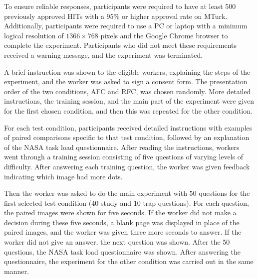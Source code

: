 \documentclass[a4paper,conference]{IEEEtran}
\begin{document}
To ensure reliable responses, participants were required to have at least 500 previously approved HITs with a 95\% or higher approval rate on MTurk. Additionally, participants were required to use a PC or laptop with a minimum logical resolution of $1366 \times 768$ pixels and the Google Chrome browser to complete the experiment. Participants who did not meet these requirements received a warning message, and the experiment was terminated.

A brief instruction was shown to the eligible workers, explaining the steps of the experiment, and the worker was asked to sign a consent form. The presentation order of the two conditions, AFC and RFC, was chosen randomly. More detailed instructions, the training session, and the main part of the experiment were given for the first chosen condition, and then this was repeated for the other condition.

For each test condition, participants received detailed instructions with examples of paired comparisons specific to that test condition, followed by an explanation of the NASA task load questionnaire.  %
After reading the instructions, workers went through a training session consisting of five questions of varying levels of difficulty. %
After answering each training question, the worker was given feedback indicating which image had more dots. 

Then the worker was asked to do the main experiment with 50 questions for the first selected test condition (40 study and 10 trap questions).  For each question, the paired images were shown for five seconds. If the worker did not make a decision during these five seconds, a blank page was displayed in place of the paired images, and the worker was given three more seconds to answer.  If the worker did not give an answer, the next question was shown. After the 50 questions, the NASA task load questionnaire was shown. After answering the questionnaire, the experiment for the other condition was carried out in the same manner. %
\end{document}

